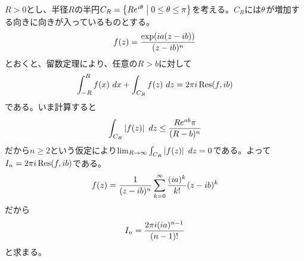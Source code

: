 \newpage

\subsubsection{}%
\begin{sol}
$R > 0$とし、半径$R$の半円$C_R = \left\{ Re^{i {\theta}} \mathrel{} \middle| \mathrel{}  0 \leq {\theta} \leq \pi \right\}$を考える。$C_R$には${\theta}$が増加する向きに向きが入っているものとする。
\[
f(z) = \frac{ \exp(ia (z-ib) )  }{ (z-ib)^n }
\]
とおくと、留数定理により、任意の$R > b$に対して
\[
\int_{-R}^R f(x) \ dx + \int_{C_R} f(z) \ dz = 2 \pi i \Res(f,ib)
\]
である。いま計算すると
\[
\int_{C_R} \left \lvert f(z) \right \rvert \ dz \leq \frac{R e^{ab}\pi }{(R-b)^n}
\]
だから$n \geq 2$という仮定により$\lim_{R \to \infty} \int_{C_R} \left \lvert f(z) \right \rvert \ dz = 0$である。よって$I_n = 2 \pi i \operatorname{Res}(f,ib)$である。
\[
f(z) = \frac{1}{(z-ib)^n} \sum_{k=0}^{\infty} \frac{ (ia)^k }{k!} (z-ib)^k
\]
だから
\[
I_n = \frac{ 2\pi i (ia)^{n-1} }{ (n-1)! }
\]
と求まる。
\end{sol}
